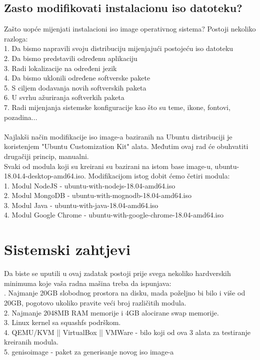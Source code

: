 \documentclass[12pt,vi]{mitthesis}
\begin{document}
\section*{Zasto modifikovati instalacionu iso datoteku?}
Zašto uopće mijenjati instalacioni iso image operativnog sistema? Postoji nekoliko razloga:\\
1. Da bismo napravili svoju distribuciju mijenjajući postojeću iso datoteku\\
2. Da bismo predstavili određenu aplikaciju\\
3. Radi lokalizacije na određeni jezik\\
4. Da bismo uklonili određene softverske pakete\\
5. S ciljem dodavanja novih softverskih paketa\\
6. U svrhu ažuriranja softverkih paketa\\
7. Radi mijenjanja sistemske konfiguracije kao što su teme, ikone, fontovi, pozadina...\\
\\
Najlakši način modifikacije iso image-a baziranih na Ubuntu distribuciji je koristenjem "Ubuntu Customization Kit" alata. Međutim ovaj rad će obuhvatiti drugačiji princip, manualni.\\
Svaki od modula koji su kreirani su bazirani na istom base image-u, ubuntu-18.04.4-desktop-amd64.iso. Modifikacijom istog dobit ćemo četiri modula:\\ 
1. Modul NodeJS - ubuntu-with-nodejs-18.04-amd64.iso\\
2. Modul MongoDB - ubuntu-with-mognodb-18.04-amd64.iso\\
3. Modul Java - ubuntu-with-java-18.04-amd64.iso\\
4. Modul Google Chrome - ubuntu-with-google-chrome-18.04-amd64.iso\\

\chapter*{Sistemski zahtjevi}
Da biste se uputili u ovaj zadatak postoji prije svega nekoliko hardverskih minimuma koje vaša radna mašina treba da ispunjava:\\
. Najmanje 20GB slobodnog prostora na disku, mada poželjno bi bilo i više od 20GB, pogotovo ukoliko pravite veći broj različitih modula.\\
2. Najmanje 2048MB RAM memorije i 4GB alocirane swap memorije.\\
3. Linux kernel sa squashfs podrškom.\\
4. QEMU/KVM || VirtualBox || VMWare - bilo koji od ova 3 alata za testiranje kreiranih modula.\\
5. genisoimage - paket za generisanje novog iso image-a\\
\end{document}
